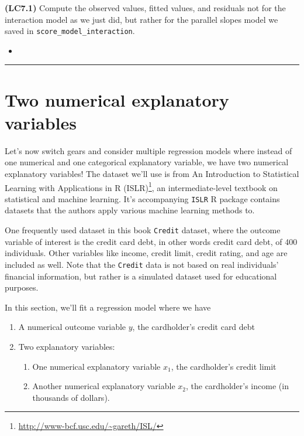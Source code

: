 \documentclass[12pt, krantz2,]{krantz}
\providecommand{\tightlist}{%
  \setlength{\itemsep}{0pt}\setlength{\parskip}{0pt}}
\renewcommand{\href}[2]{#2\footnote{\url{#1}}}
\newenvironment{rmdblock}[1]
  {\begin{shaded*}
  \begin{itemize}
  \renewcommand{\labelitemi}{
    \raisebox{-.7\height}[0pt][0pt]{
    }
  }
  \item
  }
  {
  \end{itemize}
  \end{shaded*}
  }
\newenvironment{learncheck}
  {\begin{rmdblock}{warning}}
  {\end{rmdblock}}
\begin{document}
\textbf{(LC7.1)} Compute the observed values, fitted values, and residuals not for the interaction model as we just did, but rather for the parallel slopes model we saved in \texttt{score\_model\_interaction}.

\begin{learncheck}

\end{learncheck}

\begin{center}\rule{0.5\linewidth}{\linethickness}\end{center}

\hypertarget{model3}{%
\section{Two numerical explanatory variables}\label{model3}}

Let's now switch gears and consider multiple regression models where instead of one numerical and one categorical explanatory variable, we have two numerical explanatory variables! The dataset we'll use is from \href{http://www-bcf.usc.edu/~gareth/ISL/}{An Introduction to Statistical Learning with Applications in R (ISLR)}, an intermediate-level textbook on statistical and machine learning. It's accompanying \texttt{ISLR} R package contains datasets that the authors apply various machine learning methods to.

One frequently used dataset in this book \texttt{Credit} dataset, where the outcome variable of interest is the credit card debt, in other words credit card debt, of 400 individuals. Other variables like income, credit limit, credit rating, and age are included as well. Note that the \texttt{Credit} data is not based on real individuals' financial information, but rather is a simulated dataset used for educational purposes.

In this section, we'll fit a regression model where we have

\begin{enumerate}
\def\labelenumi{\arabic{enumi}.}
\tightlist
\item
  A numerical outcome variable \(y\), the cardholder's credit card debt
\item
  Two explanatory variables:

  \begin{enumerate}
  \def\labelenumii{\arabic{enumii}.}
  \tightlist
  \item
    One numerical explanatory variable \(x_1\), the cardholder's credit limit
  \item
    Another numerical explanatory variable \(x_2\), the cardholder's income (in thousands of dollars).
  \end{enumerate}
\end{enumerate}
\end{document}
